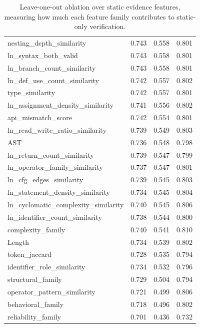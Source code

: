 \begin{table}[!htbp]
\begin{tabular}{lrrr}
nesting\_depth\_similarity & 0.743 & 0.558 & 0.801 \\
ln\_syntax\_both\_valid & 0.743 & 0.558 & 0.801 \\
ln\_branch\_count\_similarity & 0.743 & 0.558 & 0.801 \\
ln\_def\_use\_count\_similarity & 0.742 & 0.557 & 0.802 \\
type\_similarity & 0.742 & 0.557 & 0.801 \\
ln\_assignment\_density\_similarity & 0.741 & 0.556 & 0.802 \\
api\_mismatch\_score & 0.742 & 0.554 & 0.801 \\
ln\_read\_write\_ratio\_similarity & 0.739 & 0.549 & 0.803 \\
AST & 0.736 & 0.548 & 0.798 \\
ln\_return\_count\_similarity & 0.739 & 0.547 & 0.799 \\
ln\_operator\_family\_similarity & 0.737 & 0.547 & 0.801 \\
ln\_cfg\_edges\_similarity & 0.739 & 0.545 & 0.803 \\
ln\_statement\_density\_similarity & 0.734 & 0.545 & 0.804 \\
ln\_cyclomatic\_complexity\_similarity & 0.740 & 0.545 & 0.806 \\
ln\_identifier\_count\_similarity & 0.738 & 0.544 & 0.800 \\
complexity\_family & 0.740 & 0.541 & 0.810 \\
Length & 0.734 & 0.539 & 0.802 \\
token\_jaccard & 0.728 & 0.535 & 0.794 \\
identifier\_role\_similarity & 0.734 & 0.532 & 0.796 \\
structural\_family & 0.729 & 0.504 & 0.794 \\
operator\_pattern\_similarity & 0.721 & 0.499 & 0.806 \\
behavioral\_family & 0.718 & 0.496 & 0.802 \\
reliability\_family & 0.701 & 0.436 & 0.732 \\
\bottomrule
\end{tabular}
\vspace{0.5em}
\caption{Leave-one-out ablation over static evidence features, measuring how much each feature family contributes to static-only verification.}
\label{tab:static-ablation}
\end{table}
